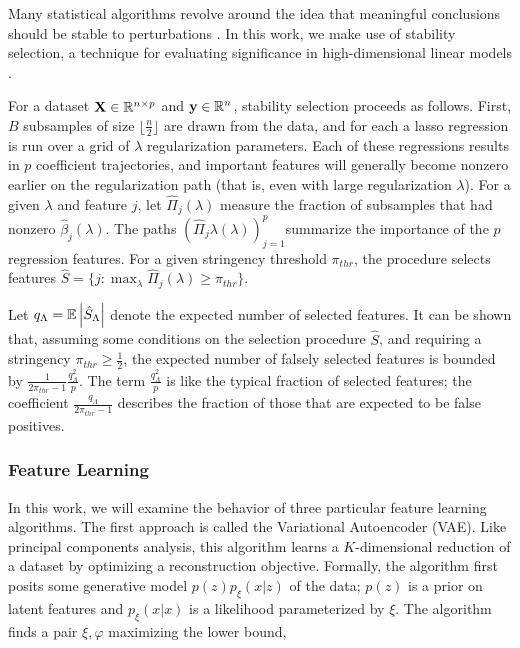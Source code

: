 Many statistical algorithms revolve around the idea that meaningful conclusions should be stable to perturbations \cite{yu2013stability}. In this work, we make use of stability selection, a technique for evaluating significance in high-dimensional linear models \cite{meinshausen2010stability}.

For a dataset $\mathbf{X}\in \mathbb{R}^{n \times p}$ and $\mathbf{y} \in
\mathbb{R}^{n}$, stability selection proceeds as follows. First, $B$ subsamples of
size $\lfloor \frac{n}{2} \rfloor$ are drawn from the data, and for each a lasso
regression is run over a grid of $\lambda$ regularization parameters. Each of
these regressions results in $p$ coefficient trajectories, and important
features will generally become nonzero earlier on the regularization path (that
is, even with large regularization $\lambda$). For a given $\lambda$ and feature
$j$, let $\hat{\Pi}_{j}\left(\lambda\right)$ measure the fraction of subsamples
that had nonzero $\hat{\beta}_j\left(\lambda\right)$. The paths
$\left(\hat{\Pi}_{j}\lambda\left(\lambda\right)\right)_{j = 1}^{p}$summarize the
importance of the $p$ regression features. For a given stringency threshold
$\pi_{thr}$, the procedure selects features $\hat{S} = \{j : \max_{\lambda}
\hat{\Pi}_{j}\left(\lambda\right) \geq \pi_{thr}\}$.

Let $q_{\Lambda} = \mathbb{E}\left|{\hat{S}_{\Lambda}}\right|$ denote the expected number of
selected features. It can be shown that, assuming some conditions on the
selection procedure $\hat{S}$, and requiring a stringency $\pi_{thr} \geq
\frac{1}{2}$, the expected number of falsely selected features is bounded by
$\frac{1}{2\pi_{thr} - 1} \frac{q_{\Lambda}^2}{p}$. The term
$\frac{q_{\Lambda}^2}{p}$ is like the typical fraction of selected features; the
coefficient $\frac{q_{\Lambda}}{2\pi_{thr} - 1}$ describes the fraction of those
that are expected to be false positives.

\subsubsection{Feature Learning}

In this work, we will examine the behavior of three particular feature learning algorithms. The first approach is called the Variational Autoencoder (VAE). Like principal components analysis, this algorithm learns a $K$-dimensional reduction of a dataset by optimizing a reconstruction objective. Formally, the algorithm first posits some generative model $p\left(z\right)p_{\xi}\left(x \vert z\right)$ of the data; $p\left(z\right)$ is a prior on latent features and $p_{\xi}\left(x \vert x\right)$ is a likelihood parameterized by $\xi$. The algorithm finds a pair $\xi, \varphi$ maximizing the lower bound,

